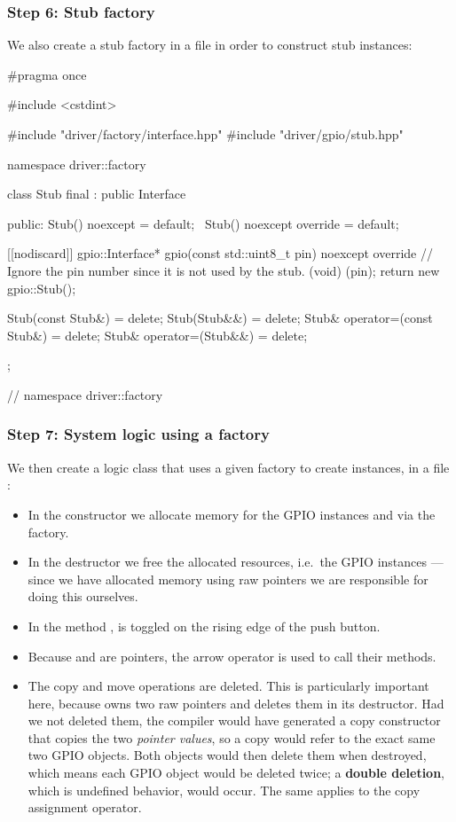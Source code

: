 \subsubsection{Step 6: Stub factory}
We also create a stub factory in a file  in order to construct stub
instances:

\begin{cppcode}
#pragma once

#include <cstdint>

#include "driver/factory/interface.hpp"
#include "driver/gpio/stub.hpp"

namespace driver::factory
{
class Stub final : public Interface
{
public:
    Stub() noexcept = default;
    ~Stub() noexcept override = default;

    [[nodiscard]] gpio::Interface* gpio(const std::uint8_t pin) noexcept override
    {
        // Ignore the pin number since it is not used by the stub.
        (void) (pin);
        return new gpio::Stub();
    }

    Stub(const Stub&)            = delete;
    Stub(Stub&&)                 = delete;
    Stub& operator=(const Stub&) = delete;
    Stub& operator=(Stub&&)      = delete;
};
} // namespace driver::factory
\end{cppcode}

\subsubsection{Step 7: System logic using a factory}
We then create a logic class that uses a given factory to create instances, in a file
:
\begin{itemize}
  \item In the constructor we allocate memory for the GPIO instances  and
     via the factory.
  \item In the destructor we free the allocated resources, i.e.\ the GPIO instances --- since we
    have allocated memory using raw pointers we are responsible for doing this ourselves.
  \item In the method ,  is toggled on the rising edge of the push button.
  \item Because  and  are pointers, the arrow operator \code{->} is used
    to call their methods.
  \item The copy and move operations are deleted. This is particularly important here, because
     owns two raw pointers and deletes them in its destructor. Had we not deleted them,
    the compiler would have generated a copy constructor that copies the two \emph{pointer values},
    so a copy would refer to the exact same two GPIO objects. Both objects would then delete them
    when destroyed, which means each GPIO object would be deleted twice; a \textbf{double
    deletion}, which is undefined behavior, would occur. The same applies to the copy assignment
    operator.
\end{itemize}

